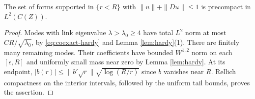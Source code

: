 \begin{lemma}\label{lem:compact-cone}
The set of forms supported in $\{r<R\}$ with
$\|u\|+\|Du\|\le1$ is precompact in $L^2(C(Z))$.
\end{lemma}
\begin{proof}
Modes with link eigenvalue $\lambda>\lambda_0\ge4$ have total
$L^2$ norm at most $CR/\sqrt{\lambda_0}$, by
\eqref{eq:coexact-hardy} and Lemma \ref{lem:hardy}(1).
There are finitely many remaining modes. Their coefficients have
bounded $W^{1,2}$ norm on each $[\epsilon,R]$ and uniformly small
mass near zero by Lemma \ref{lem:hardy}. At its endpoint,
$|b(r)|\le\|b'\sqrt r\|\sqrt{\log(R/r)}$ since $b$ vanishes
near $R$. Rellich compactness on the interior intervals, followed
by the uniform tail bounds, proves the assertion.
\end{proof}
